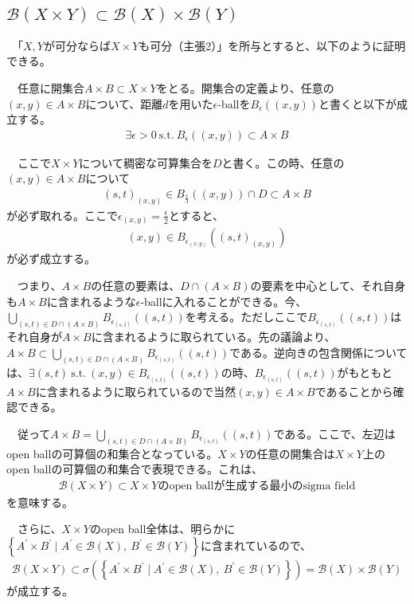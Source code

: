 \documentclass{article}
\begin{document}
\subsection{$\mathcal{B}(X\times Y)\subset \mathcal{B}(X)\times\mathcal{B}(Y)$}
　「$X,Y$が可分ならば$X\times Y$も可分（主張2）」を所与とすると、以下のように証明できる。

　任意に開集合$A\times B \subset X\times Y$をとる。開集合の定義より、任意の$(x,y) \in A\times B$について、距離$d$を用いた$\epsilon$-ballを$B_{\epsilon}((x,y))$と書くと以下が成立する。
\begin{align*}
	\exists \epsilon > 0\ \text{s.t.}\ B_{\epsilon}((x,y)) \subset A\times B
\end{align*}

　ここで$X\times Y$について稠密な可算集合を$D$と書く。この時、任意の$(x,y) \in A\times B$について
\begin{align*}
	(s,t)_{(x,y)} \in B_{\frac{\epsilon}{3}}((x,y)) \cap D \subset A\times B
\end{align*}
が必ず取れる。ここで$\epsilon_{(x,y)} = \frac{\epsilon}{2}$とすると、
\begin{align*}
	(x,y) \in B_{\epsilon_{(x,y)}}((s,t)_{(x,y)})
\end{align*}
が必ず成立する。

　つまり、$A\times B$の任意の要素は、$D\cap (A\times B)$の要素を中心として、それ自身も$A\times B$に含まれるような$\epsilon$-ballに入れることができる。今、$\bigcup_{(s,t)\in D\cap(A\times B)} B_{\epsilon_{(s,t)}}((s,t))$を考える。ただしここで$B_{\epsilon_{(s,t)}}((s,t))$はそれ自身が$A\times B$に含まれるように取られている。先の議論より、$A\times B \subset \bigcup_{(s,t)\in D\cap(A\times B)} B_{\epsilon_{(s,t)}}((s,t))$である。逆向きの包含関係については、$\exists (s,t)\ \text{s.t.}\ (x, y)\in B_{\epsilon_{(s,t)}}((s,t))$の時、$B_{\epsilon_{(s,t)}}((s,t))$がもともと$A\times B$に含まれるように取られているので当然$(x, y)\in A\times B$であることから確認できる。

　従って$A\times B = \bigcup_{(s,t)\in D\cap(A\times B)} B_{\epsilon_{(s,t)}}((s,t))$である。ここで、左辺はopen ballの可算個の和集合となっている。$X\times Y$の任意の開集合は$X\times Y$上のopen ballの可算個の和集合で表現できる。これは、
\begin{align*}
\mathcal{B}(X\times Y) \subset \text{$X\times Y$のopen ballが生成する最小のsigma field}
\end{align*}
を意味する。

　さらに、$X\times Y$のopen ball全体は、明らかに$\left\{ A^{'} \times B^{'} \mid A^{'} \in \mathcal{B}(X),\ B^{'} \in \mathcal{B}(Y) \right\}$に含まれているので、
\begin{align*}
	\mathcal{B}(X\times Y) \subset \sigma\left( \left\{ A^{'} \times B^{'} \mid A^{'} \in \mathcal{B}(X),\ B^{'} \in \mathcal{B}(Y) \right\} \right) = \mathcal{B}(X)\times\mathcal{B}(Y)
\end{align*}
が成立する。
\end{document}

